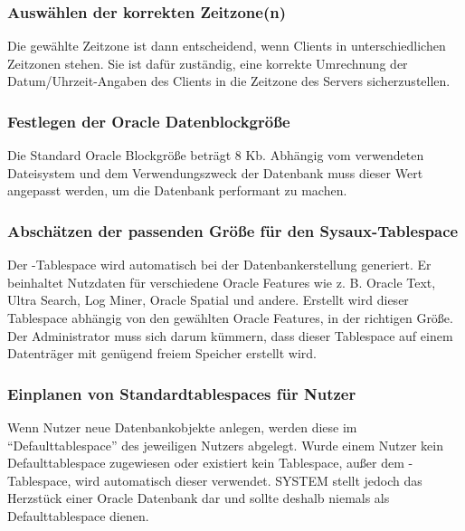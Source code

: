           \begin{literaturinternet}
            \item \cite{NLSPG002}
          \end{literaturinternet}

        \subsubsection{Ausw\"ahlen der korrekten Zeitzone(n)}
          Die gew\"ahlte Zeitzone ist dann entscheidend, wenn Clients in unterschiedlichen Zeitzonen stehen. Sie ist daf\"ur zust\"andig, eine korrekte Umrechnung der Datum/Uhrzeit-Angaben des Clients in die Zeitzone des Servers sicherzustellen.

          \begin{literaturinternet}
            \item \cite{i1006705}
          \end{literaturinternet}

        \subsubsection{Festlegen der Oracle Datenblockgr\"o\ss e}
          Die Standard Oracle Blockgr\"o\ss e betr\"agt 8 Kb. Abh\"angig vom verwendeten Dateisystem und dem Verwendungszweck der Datenbank muss dieser Wert angepasst werden, um die Datenbank performant zu machen.
        \subsubsection{Absch\"atzen der passenden Gr\"o\ss e f\"ur den Sysaux-Tablespace}
          Der -Tablespace wird automatisch bei der Datenbankerstellung generiert. Er beinhaltet Nutzdaten f\"ur verschiedene Oracle Features wie z. B. Oracle Text, Ultra Search, Log Miner, Oracle Spatial und andere. Erstellt wird dieser Tablespace abh\"angig von den gew\"ahlten Oracle Features, in der richtigen Gr\"o\ss e. Der Administrator muss sich darum k\"ummern, dass dieser Tablespace auf einem Datentr\"ager mit gen\"ugend freiem Speicher erstellt wird.
        \subsubsection{Einplanen von Standardtablespaces f\"ur Nutzer}
          Wenn Nutzer neue Datenbankobjekte anlegen, werden diese im \enquote{Defaulttablespace} des jeweiligen Nutzers abgelegt. Wurde einem Nutzer kein Defaulttablespace zugewiesen oder existiert kein Tablespace, au\ss{}er dem -Tablespace, wird automatisch dieser verwendet. SYSTEM stellt jedoch das Herzst\"uck einer Oracle Datenbank dar und sollte deshalb niemals als Defaulttablespace dienen.
